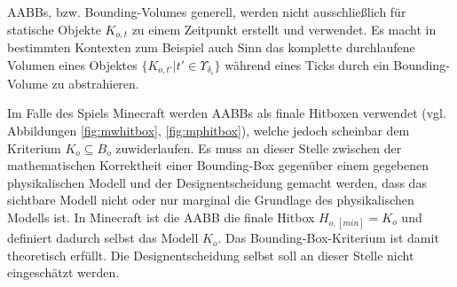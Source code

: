 AABBs, bzw. Bounding-Volumes generell, werden nicht ausschließlich für statische Objekte $K_{o,t}$ zu einem Zeitpunkt erstellt und verwendet. Es macht in bestimmten Kontexten zum Beispiel auch Sinn das komplette durchlaufene Volumen eines Objektes $\{K_{o,t'} | t' \in \Upsilon_{\delta_i}\}$ während eines Ticks durch ein Bounding-Volume zu abstrahieren.

Im Falle des Spiels Minecraft werden AABBs als finale Hitboxen verwendet (vgl. Abbildungen \ref{fig:mwhitbox}, \ref{fig:mphitbox}), welche jedoch scheinbar dem Kriterium $K_o \subseteq B_o$ zuwiderlaufen. Es muss an dieser Stelle zwischen der mathematischen Korrektheit einer Bounding-Box gegenüber einem gegebenen physikalischen Modell und der Designentscheidung gemacht werden, dass das sichtbare Modell nicht oder nur marginal die Grundlage des physikalischen Modells ist. In Minecraft ist die AABB die finale Hitbox  $H_{o, [min]} = K_o$ und definiert dadurch selbst das Modell $K_o$. Das Bounding-Box-Kriterium ist damit theoretisch erfüllt. Die Designentscheidung selbst soll an dieser Stelle nicht eingeschätzt werden.
